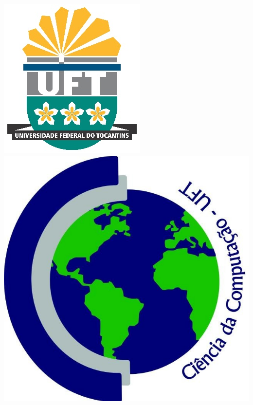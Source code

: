\documentclass[11pt,oneside,a4paper]{book}
\begin{document}
\begin{titlepage}

\begin{center}
\includegraphics[scale=0.8]{logouft.jpg}
\hspace{3em}
\includegraphics[scale=0.11]{logoccomp.jpg}
\hspace{3em}

\end{center}
\end{titlepage}
\end{document}
